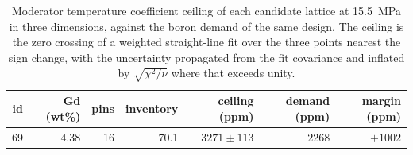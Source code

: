 \begin{table}[htbp]
  \centering
  \caption[Boron ceiling of each candidate lattice]{Moderator temperature coefficient ceiling of each candidate lattice at \SI{15.5}{MPa} in three dimensions, against the boron demand of the same design. The ceiling is the zero crossing of a weighted straight-line fit over the three points nearest the sign change, with the uncertainty propagated from the fit covariance and inflated by $\sqrt{\chi^2/\nu}$ where that exceeds unity.}
  \label{tab:c9-ceilings}
  \begin{tabular}{rrrrrrr}
    \toprule
    id & Gd (wt\%) & pins & inventory & ceiling (ppm) & demand (ppm) & margin (ppm) \\
    \midrule
    69 & 4.38 & 16 & 70.1 & $3271 \pm 113$ & 2268 & $+1002$ \\
    \bottomrule
  \end{tabular}
\end{table}
